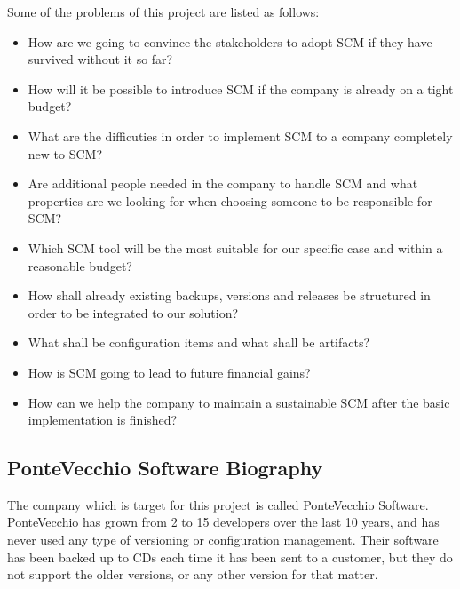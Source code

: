 \documentclass{article}
\begin{document}
\hfill \break
\noindent Some of the problems of this project are  listed as follows:
\begin{itemize}
\item How are we going to convince the stakeholders to adopt SCM if they have survived without it so far?
\item How will it be possible to introduce SCM if the company is already on a tight budget?
\item What are the difficuties in order to implement SCM to a company completely new to SCM?
\item Are additional people needed in the company to handle SCM and what properties are we looking for when choosing someone to be responsible for SCM?
\item Which SCM tool will be the most suitable for our specific case and within a reasonable budget?
\item How shall already existing backups, versions and releases be structured in order to be integrated to our solution?
\item What shall be configuration items and what shall be artifacts?
\item How is SCM going to lead to future financial gains?
\item How can we help the company to maintain a sustainable SCM after the basic implementation is finished?
\end{itemize}

\subsection{PonteVecchio Software Biography}
The company which is target for this project is called PonteVecchio Software. PonteVecchio has grown from 2 to 15 developers over the last 10 years, and has never used any type of versioning or configuration management. Their software has been backed up to CDs each time it has been sent to a customer, but they do not support the older versions, or any other version for that matter. 
\mbox{} \\
\end{document}
